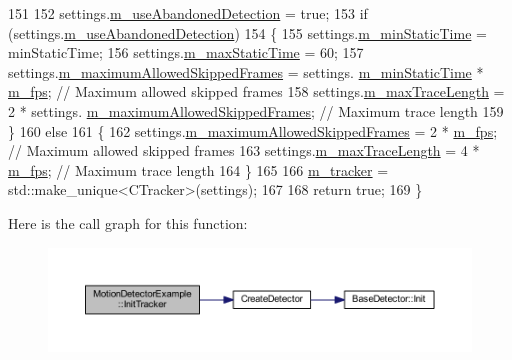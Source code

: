 \begin{DoxyCode}
151 
152         settings.\mbox{\hyperlink{struct_tracker_settings_ad38082863e30ac990ff8d5b49a02ee70}{m\_useAbandonedDetection}} = \textcolor{keyword}{true};
153         \textcolor{keywordflow}{if} (settings.\mbox{\hyperlink{struct_tracker_settings_ad38082863e30ac990ff8d5b49a02ee70}{m\_useAbandonedDetection}})
154         \{
155             settings.\mbox{\hyperlink{struct_tracker_settings_aee7628ff95fa54ad4422e01d45690a6d}{m\_minStaticTime}} = minStaticTime;
156             settings.\mbox{\hyperlink{struct_tracker_settings_a810f1687289a964756cd700a22d219d2}{m\_maxStaticTime}} = 60;
157             settings.\mbox{\hyperlink{struct_tracker_settings_a7825c3e88ee979fba2844c238fc51139}{m\_maximumAllowedSkippedFrames}} = settings.
      \mbox{\hyperlink{struct_tracker_settings_aee7628ff95fa54ad4422e01d45690a6d}{m\_minStaticTime}} * \mbox{\hyperlink{class_video_example_ae8110012f8d57f39d6355377cf20fb27}{m\_fps}}; \textcolor{comment}{// Maximum allowed skipped frames}
158             settings.\mbox{\hyperlink{struct_tracker_settings_abc7ce62dfe8de5ae33506aac41fddcac}{m\_maxTraceLength}} = 2 * settings.
      \mbox{\hyperlink{struct_tracker_settings_a7825c3e88ee979fba2844c238fc51139}{m\_maximumAllowedSkippedFrames}};        \textcolor{comment}{// Maximum trace length}
159         \}
160         \textcolor{keywordflow}{else}
161         \{
162             settings.\mbox{\hyperlink{struct_tracker_settings_a7825c3e88ee979fba2844c238fc51139}{m\_maximumAllowedSkippedFrames}} = 2 * 
      \mbox{\hyperlink{class_video_example_ae8110012f8d57f39d6355377cf20fb27}{m\_fps}}; \textcolor{comment}{// Maximum allowed skipped frames}
163             settings.\mbox{\hyperlink{struct_tracker_settings_abc7ce62dfe8de5ae33506aac41fddcac}{m\_maxTraceLength}} = 4 * \mbox{\hyperlink{class_video_example_ae8110012f8d57f39d6355377cf20fb27}{m\_fps}};              \textcolor{comment}{// Maximum trace
       length}
164         \}
165 
166         \mbox{\hyperlink{class_video_example_a7c58cd8c883981b2e645d1a3d8edf76a}{m\_tracker}} = std::make\_unique<CTracker>(settings);
167 
168         \textcolor{keywordflow}{return} \textcolor{keyword}{true};
169     \}
\end{DoxyCode}
Here is the call graph for this function\+:\nopagebreak
\begin{figure}[H]
\begin{center}
\leavevmode
\includegraphics[width=350pt]{class_motion_detector_example_ae814c565a7d6a9dbab9e8a99c790a77f_cgraph}
\end{center}
\end{figure}
\mbox{\label{class_video_example_a87efc66a82c36ad3380623d30a12abf2}} 
